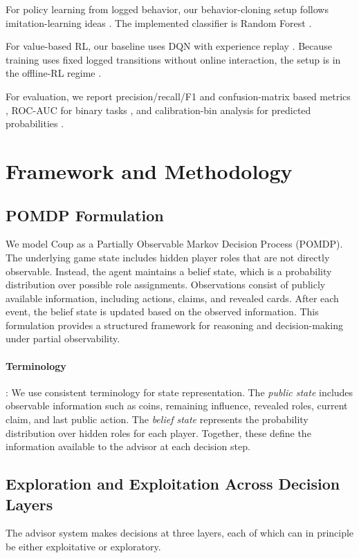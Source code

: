 \documentclass[11pt]{article}
\begin{document}
For policy learning from logged behavior, our behavior-cloning setup follows imitation-learning ideas \cite{ross2011dagger, osa2018imitation}. The implemented classifier is Random Forest \cite{breiman2001rf}.

For value-based RL, our baseline uses DQN \cite{mnih2015dqn} with experience replay \cite{lin1992replay}. Because training uses fixed logged transitions without online interaction, the setup is in the offline-RL regime \cite{levine2020offline}.

For evaluation, we report precision/recall/F1 and confusion-matrix based metrics \cite{sokolova2009metrics}, ROC-AUC for binary tasks \cite{fawcett2006roc}, and calibration-bin analysis for predicted probabilities \cite{niculescu2005calibration}.

\section{Framework and Methodology}
\subsection{POMDP Formulation}
We model Coup as a Partially Observable Markov Decision Process (POMDP). The underlying game state includes hidden player roles that are not directly observable. Instead, the agent maintains a belief state, which is a probability distribution over possible role assignments. Observations consist of publicly available information, including actions, claims, and revealed cards. After each event, the belief state is updated based on the observed information. This formulation provides a structured framework for reasoning and decision-making under partial observability.

\paragraph{Terminology}:
We use consistent terminology for state representation. The \textit{public state} includes observable information such as coins, remaining influence, revealed roles, current claim, and last public action. The \textit{belief state} represents the probability distribution over hidden roles for each player. Together, these define the information available to the advisor at each decision step.

\subsection{Exploration and Exploitation Across Decision Layers}
The advisor system makes decisions at three layers, each of which can in principle be either exploitative or exploratory.
\end{document}
